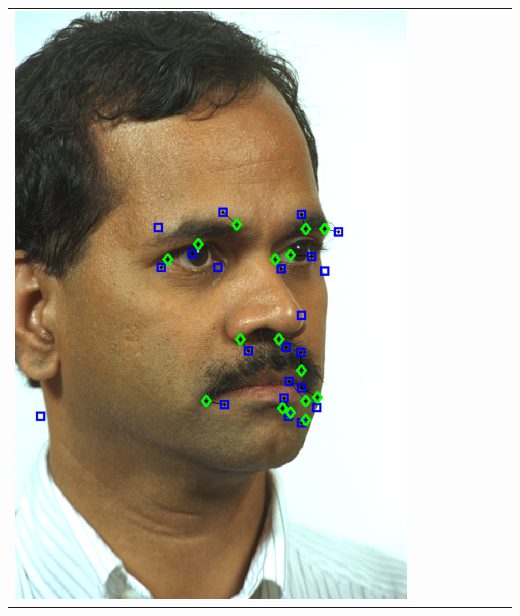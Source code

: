 \documentclass[landscape,final,a0paper,fontscale=0.27065]{baposter}
\begin{document}
\begin{poster}
{{\begin{tabular}{@{}rccccccc@{}}
 \parbox[c]{0.11\linewidth}{\includegraphics[width=\linewidth]{images/l_qr_fail.pdf}} &

\end{tabular}}}
\end{poster}
\end{document}
